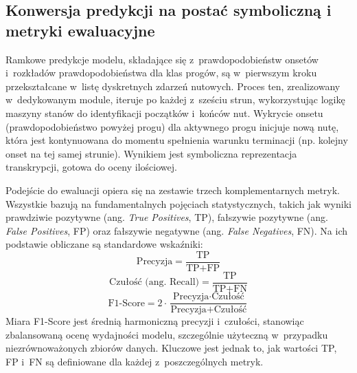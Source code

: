 \subsection{Konwersja predykcji na postać symboliczną i metryki ewaluacyjne}
\label{ssec:konwersja_i_metryki}

Ramkowe predykcje modelu, składające się z~prawdopodobieństw onsetów i~rozkładów prawdopodobieństwa dla klas progów, są w~pierwszym kroku przekształcane w~listę dyskretnych zdarzeń nutowych. Proces ten, zrealizowany w~dedykowanym module, iteruje po każdej z~sześciu strun, wykorzystując logikę maszyny stanów do identyfikacji początków i~końców nut. Wykrycie onsetu (prawdopodobieństwo powyżej progu) dla aktywnego progu inicjuje nową nutę, która jest kontynuowana do momentu spełnienia warunku terminacji (np. kolejny onset na tej samej strunie). Wynikiem jest symboliczna reprezentacja transkrypcji, gotowa do oceny ilościowej.

Podejście do ewaluacji opiera się na zestawie trzech komplementarnych metryk. Wszystkie bazują na fundamentalnych pojęciach statystycznych, takich jak wyniki prawdziwie pozytywne (ang. \textit{True Positives}, TP), fałszywie pozytywne (ang. \textit{False Positives}, FP) oraz fałszywie negatywne (ang. \textit{False Negatives}, FN). Na ich podstawie obliczane są standardowe wskaźniki:
\begin{equation}
    \text{Precyzja} = \frac{\text{TP}}{\text{TP} + \text{FP}}
    \label{eq:precision}
\end{equation}
\begin{equation}
    \text{Czułość (ang. Recall)} = \frac{\text{TP}}{\text{TP} + \text{FN}}
    \label{eq:recall}
\end{equation}
\begin{equation}
    \text{F1-Score} = 2 \cdot \frac{\text{Precyzja} \cdot \text{Czułość}}{\text{Precyzja} + \text{Czułość}}
    \label{eq:f1_score}
\end{equation}
Miara F1-Score jest średnią harmoniczną precyzji i~czułości, stanowiąc zbalansowaną ocenę wydajności modelu, szczególnie użyteczną w~przypadku niezrównoważonych zbiorów danych. Kluczowe jest jednak to, jak wartości TP, FP i~FN są definiowane dla każdej z~poszczególnych metryk.


